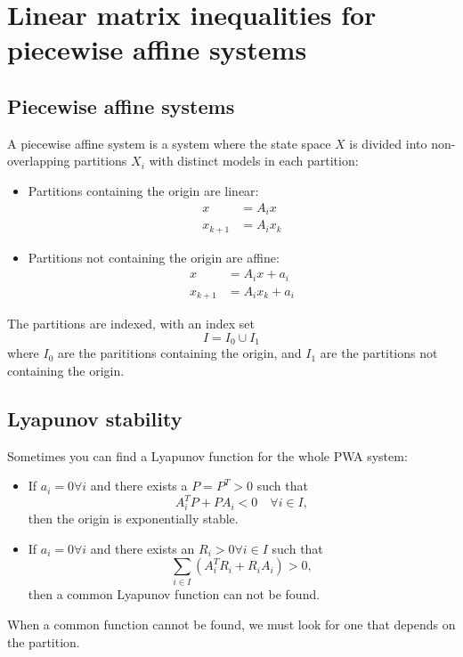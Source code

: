 \section{Linear matrix inequalities for piecewise affine systems}

\subsection{Piecewise affine systems}
A piecewise affine system is a system where the state space $X$ is divided into non-overlapping partitions $X_i$ with distinct models in each partition:
%
\begin{itemize}
  \item Partitions containing the origin are linear:
  \begin{equation}
    \begin{split}
      x &= A_i x \\
      x_{k+1} &= A_i x_k
    \end{split}
  \end{equation}
  \item Partitions not containing the origin are affine:
  \begin{equation}
    \begin{split}
      x &= A_i x + a_i \\
      x_{k+1} &= A_i x_k + a_i
    \end{split}
  \end{equation}
\end{itemize}
%
The partitions are indexed, with an index set
%
\begin{equation}
  I = I_0 \cup I_1
\end{equation}
%
where $I_0$ are the parititions containing the origin, and $I_1$ are the partitions not containing the origin.

\subsection{Lyapunov stability}
Sometimes you can find a Lyapunov function for the whole PWA system:
%
\begin{itemize}
  \item If $a_i = 0 \forall i$ and there exists a $P = P^T > 0$ such that
  \begin{equation}
    A_i^T P + P A_i < 0 \quad \forall i \in I,
  \end{equation}
  then the origin is exponentially stable.
  \item If $a_i = 0 \forall i$ and there exists an $R_i > 0 \forall i \in I$ such that
  \begin{equation}
    \sum_{i \in I} (A_i^T R_i + R_i A_i) > 0,
  \end{equation}
  then a common Lyapunov function can not be found.
\end{itemize}
%
When a common function cannot be found, we must look for one that depends on the partition.

